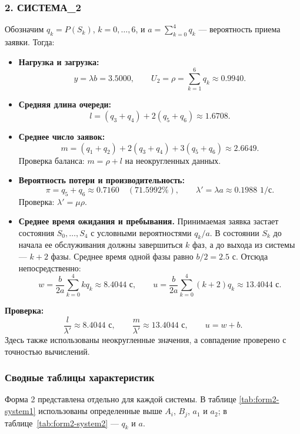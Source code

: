 \documentclass[a4paper,12pt]{article}
\begin{document}
    \subsubsection*{2. СИСТЕМА\_2}
    Обозначим $q_k=P(S_k)$, $k=0,\ldots,6$, и $a=\sum_{k=0}^{4}q_k$ ---
    вероятность приема заявки. Тогда:
    \begin{itemize}
        \item \textbf{Нагрузка и загрузка:}
        \[
            y=\lambda b=3.5000,\qquad U_2=\rho=\sum_{k=1}^{6}q_k\approx0.9940.
        \]
        \item \textbf{Средняя длина очереди:}
        \[
            l=(q_3+q_4)+2(q_5+q_6)\approx1.6708.
        \]
        \item \textbf{Среднее число заявок:}
        \[
            m=(q_1+q_2)+2(q_3+q_4)+3(q_5+q_6)\approx2.6649.
        \]
        Проверка баланса: $m=\rho+l$ на неокругленных данных.
        \item \textbf{Вероятность потери и производительность:}
        \[
            \pi=q_5+q_6\approx0.7160\quad(71.5992\%),
            \qquad \lambda'=\lambda a\approx0.1988\text{ 1/с}.
        \]
        Проверка: $\lambda'=\mu\rho$.

        \item \textbf{Среднее время ожидания и пребывания.}
        Принимаемая заявка застает состояния $S_0,\ldots,S_4$ с условными
        вероятностями $q_k/a$. В состоянии $S_k$ до начала ее обслуживания
        должны завершиться $k$ фаз, а до выхода из системы --- $k+2$ фазы.
        Среднее время одной фазы равно $b/2=2.5$ с. Отсюда непосредственно:
        \[
            w=\frac{b}{2a}\sum_{k=0}^{4}kq_k\approx8.4044\text{ с},
            \qquad
            u=\frac{b}{2a}\sum_{k=0}^{4}(k+2)q_k\approx13.4044\text{ с}.
        \]
    \end{itemize}
    \textbf{Проверка:}
    \[
        \frac{l}{\lambda'}\approx8.4044\text{ с},\qquad
        \frac{m}{\lambda'}\approx13.4044\text{ с},\qquad u=w+b.
    \]
    Здесь также использованы неокругленные значения, а совпадение проверено
    с точностью вычислений.

    \subsubsection*{Сводные таблицы характеристик}
    Форма 2 представлена отдельно для каждой системы. В таблице
    \ref{tab:form2-system1} использованы определенные выше $A_i$, $B_j$,
    $a_1$ и $a_2$; в таблице~\ref{tab:form2-system2} --- $q_k$ и $a$.
\end{document}
